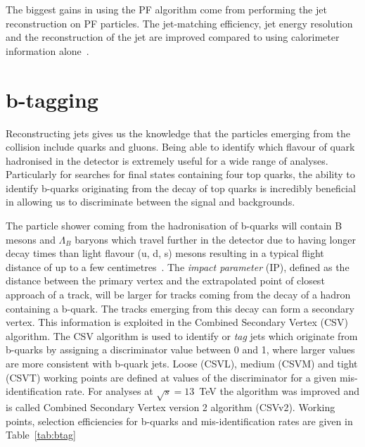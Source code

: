 The biggest gains in using the PF algorithm come from performing the jet reconstruction on PF particles. The jet-matching efficiency, jet energy resolution and the reconstruction of the jet \pt are improved compared to using calorimeter information alone~\cite{CMS-PAS-PFT-10-001}. 

\section{b-tagging ~\label{sec:btagreco}}
Reconstructing jets gives us the knowledge that the particles emerging from the collision include quarks and gluons. Being able to identify which flavour of quark hadronised in the detector is extremely useful for a wide range of analyses. Particularly for searches for final states containing four top quarks, the ability to identify b-quarks originating from the decay of top quarks is incredibly beneficial in allowing us to discriminate between the signal and backgrounds. 

The particle shower coming from the hadronisation of b-quarks will contain B mesons and $\Lambda_{B}$ baryons which travel further in the detector due to having longer decay times than light flavour (u, d, s) mesons resulting in a typical flight distance of up to a few centimetres~\cite{Collaboration2015BS0}. The \emph{impact parameter} (IP), defined as the distance between the primary vertex and the extrapolated point of closest approach of a track, will be larger for tracks coming from the decay of a hadron containing a b-quark. The tracks emerging from this decay can form a secondary vertex. This information is exploited in the Combined Secondary Vertex (CSV) algorithm. The CSV algorithm is used to identify or \emph{tag} jets which originate from b-quarks by assigning a discriminator value between 0 and 1, where larger values are more consistent with b-quark jets. Loose (CSVL), medium (CSVM) and tight (CSVT) working points are defined at values of the discriminator for a given mis-identification rate. For analyses at $\sqrt{s} = 13$~TeV the algorithm was improved and is called Combined Secondary Vertex version 2 algorithm (CSVv2). Working points, selection efficiencies for b-quarks and mis-identification rates are given in Table~\ref{tab:btag} 


